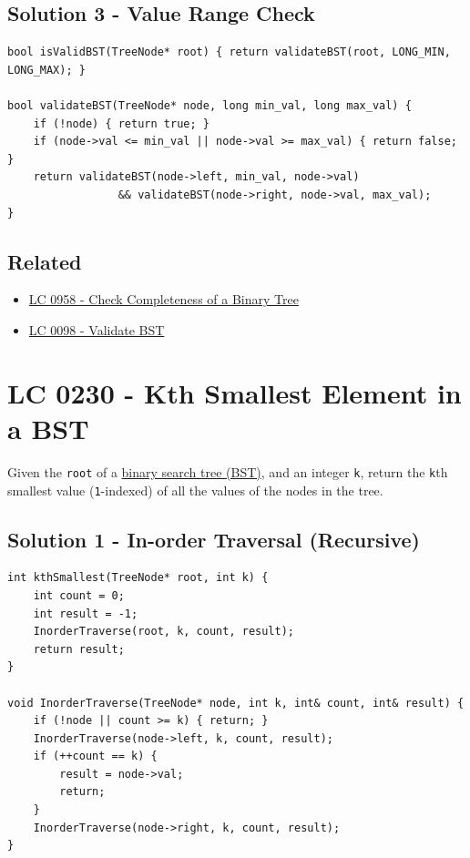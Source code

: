 \subsection*{Solution 3 - Value Range Check}
\begin{lstlisting}
bool isValidBST(TreeNode* root) { return validateBST(root, LONG_MIN, LONG_MAX); }

bool validateBST(TreeNode* node, long min_val, long max_val) {
	if (!node) { return true; }
	if (node->val <= min_val || node->val >= max_val) { return false; }
	return validateBST(node->left, min_val, node->val)
				 && validateBST(node->right, node->val, max_val);
}
\end{lstlisting}

\subsection*{Related}
\begin{itemize}
	\item \hyperref[lc0958]{LC 0958 - Check Completeness of a Binary Tree}
	\item \hyperref[lc0098]{LC 0098 - Validate BST}
\end{itemize}

\section{LC 0230 - Kth Smallest Element in a BST}
Given the {\colorbox{CodeBackground}{\lstinline|root|}} of a \ul{binary search tree (BST)}, and an integer {\colorbox{CodeBackground}{\lstinline|k|}}, return the {\colorbox{CodeBackground}{\lstinline|k|}}th smallest value ({\colorbox{CodeBackground}{\lstinline|1|}}-indexed) of all the values of the nodes in the tree.

\subsection*{Solution 1 - In-order Traversal (Recursive)}
\begin{lstlisting}
int kthSmallest(TreeNode* root, int k) {
	int count = 0;
	int result = -1;
	InorderTraverse(root, k, count, result);
	return result;
}

void InorderTraverse(TreeNode* node, int k, int& count, int& result) {
	if (!node || count >= k) { return; }
	InorderTraverse(node->left, k, count, result);
	if (++count == k) {
		result = node->val;
		return;
	}
	InorderTraverse(node->right, k, count, result);
}
\end{lstlisting}

